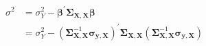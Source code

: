 \begin{equation}
	\begin{split}
		\sigma^2
		&=
		\sigma_{Y}^{2}
		-
		\boldsymbol{\beta}^{\prime}
		\boldsymbol{\Sigma}_{\mathbf{X}, \mathbf{X}}
		\boldsymbol{\beta} \\
		&=
		\sigma_{Y}^{2}
		-
		\left(
		\boldsymbol{\Sigma}_{\mathbf{X}, \mathbf{X}}^{-1}
		\boldsymbol{\sigma}_{\mathbf{y}, \mathbf{X}}
		\right)^{\prime}
		\boldsymbol{\Sigma}_{\mathbf{X}, \mathbf{X}}
		\left(
		\boldsymbol{\Sigma}_{\mathbf{X}, \mathbf{X}}^{-1}
		\boldsymbol{\sigma}_{\mathbf{y}, \mathbf{X}}
		\right)
	\end{split}
	\label{eq:strRegression-sigmasq-of-sigmacap}
\end{equation}
